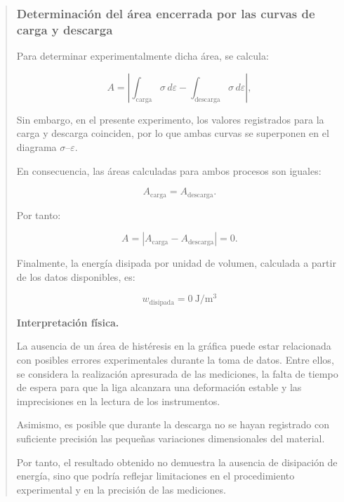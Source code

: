\documentclass[11pt,a4paper]{article}
\begin{document}
\begin{quote}
\subsubsection{Determinación del área encerrada
por las curvas de carga y descarga}

Para determinar experimentalmente dicha área, se calcula:

\begin{equation}
    A =
    \left|
    \int_{\mathrm{carga}}\sigma\,d\varepsilon
    -
    \int_{\mathrm{descarga}}\sigma\,d\varepsilon
    \right|,
\end{equation}

Sin embargo, en el presente experimento, los valores
registrados para la carga y descarga coinciden,
por lo que ambas curvas se superponen en el
diagrama $\sigma$--$\varepsilon$.

En consecuencia, las áreas calculadas para ambos
procesos son iguales:

\begin{equation}
    A_{\mathrm{carga}}=A_{\mathrm{descarga}}.
\end{equation}

Por tanto:

\begin{equation}
    A =
    \left|A_{\mathrm{carga}}-A_{\mathrm{descarga}}\right|
    =0.
\end{equation}

Finalmente, la energía disipada por unidad de
volumen, calculada a partir de los datos disponibles,
es:

\begin{equation}
    \boxed{
    w_{\mathrm{disipada}}=0\ \mathrm{J/m^3}
    }
\end{equation}

\noindent\textbf{Interpretación física.}

La ausencia de un área de histéresis en la gráfica
puede estar relacionada con posibles errores
experimentales durante la toma de datos. Entre
ellos, se considera la realización apresurada de
las mediciones, la falta de tiempo de espera para
que la liga alcanzara una deformación estable y
las imprecisiones en la lectura de los instrumentos.

Asimismo, es posible que durante la descarga no
se hayan registrado con suficiente precisión las
pequeñas variaciones dimensionales del material.

Por tanto, el resultado obtenido no demuestra
la ausencia de disipación de energía, sino que
podría reflejar limitaciones en el procedimiento
experimental y en la precisión de las mediciones.



\end{quote}
\end{document}
